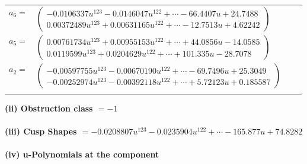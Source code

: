 \documentclass[1p]{elsarticle_modified}
\theoremstyle{definition}
\begin{document}
\begin{tabular}{m{7pt} m{180pt} m{7pt} m{180pt} }
\flushright $a_{6}=$&$\begin{pmatrix}-0.0106337 u^{123}-0.0146047 u^{122}+\cdots-66.4407 u+24.7488\\0.00372489 u^{123}+0.00631165 u^{122}+\cdots-12.7513 u+4.62242\end{pmatrix}$ \\
\flushright $a_{5}=$&$\begin{pmatrix}0.00761734 u^{123}+0.00955153 u^{122}+\cdots+44.0856 u-14.0585\\0.0119599 u^{123}+0.0204629 u^{122}+\cdots+101.335 u-28.7078\end{pmatrix}$ \\
\flushright $a_{2}=$&$\begin{pmatrix}-0.00597755 u^{123}-0.00670190 u^{122}+\cdots-69.7496 u+25.3049\\-0.00252974 u^{123}-0.00392118 u^{122}+\cdots+5.72123 u+0.185587\end{pmatrix}$\\&\end{tabular}
\flushleft \textbf{(ii) Obstruction class $= -1$}\\~\\
\flushleft \textbf{(iii) Cusp Shapes $= -0.0208807 u^{123}-0.0235904 u^{122}+\cdots-165.877 u+74.8282$}\\~\\
\newpage\renewcommand{\arraystretch}{1}
\flushleft \textbf{(iv) u-Polynomials at the component}\newline \\
\end{document}
